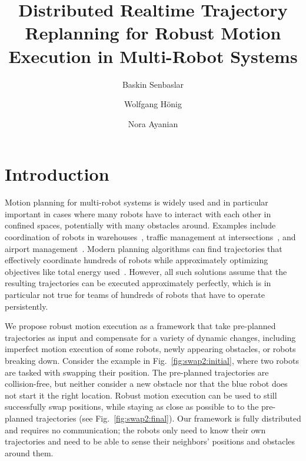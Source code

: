 \documentclass{svproc}
\begin{document}
\mainmatter              %
%
% 
\title{Distributed Realtime Trajectory Replanning for Robust Motion Execution in Multi-Robot Systems}


%
%
\author{Baskin Senbaslar \and Wolfgang H\"onig \and
Nora Ayanian}
%
%
%

\maketitle              %

\begin{abstract}
\end{abstract}


\section{Introduction}
Motion planning for multi-robot systems is widely used and in particular important in cases where many robots have to interact with each other in confined spaces, potentially with many obstacles around.
Examples include coordination of robots in warehouses~\cite{Kiva}, traffic management at intersections~\cite{IntersectionManagementDresner}, and airport management~\cite{AirportTug}.
Modern planning algorithms can find trajectories that effectively coordinate hundreds of robots while approximately optimizing objectives like total energy used~\cite{crazyplanning-ieeetro}.
However, all such solutions assume that the resulting trajectories can be executed approximately perfectly, which is in particular not true for teams of hundreds of robots that have to operate persistently.

We propose robust motion execution as a framework that take pre-planned trajectories as input and compensate for a variety of dynamic changes, including imperfect motion execution of some robots, newly appearing obstacles, or robots breaking down.
Consider the example in Fig.~\ref{fig:swap2:initial}, where two robots are tasked with swapping their position.
The pre-planned trajectories are collision-free, but neither consider a new obstacle nor that the blue robot does not start it the right location.
Robust motion execution can be used to still successfully swap positions, while staying as close as possible to to the pre-planned trajectories (see Fig.~\ref{fig:swap2:final}).
Our framework is fully distributed and requires no communication; the robots only need to know their own trajectories and need to be able to sense their neighbors' positions and obstacles around them.
\end{document}
